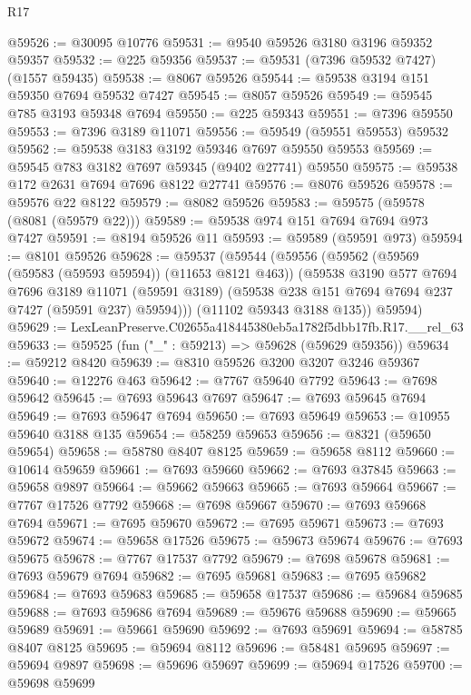 \begin{lexlean}{R17}
\begin{coremodule}
@59526 := @30095 @10776
@59531 := @9540 @59526 @3180 @3196 @59352 @59357
@59532 := @225 @59356
@59537 := @59531 (@7396 @59532 @7427) (@1557 @59435)
@59538 := @8067 @59526
@59544 := @59538 @3194 @151 @59350 @7694 @59532 @7427
@59545 := @8057 @59526
@59549 := @59545 @785 @3193 @59348 @7694
@59550 := @225 @59343
@59551 := @7396 @59550
@59553 := @7396 @3189 @11071
@59556 := @59549 (@59551 @59553) @59532
@59562 := @59538 @3183 @3192 @59346 @7697 @59550 @59553
@59569 := @59545 @783 @3182 @7697 @59345 (@9402 @27741) @59550
@59575 := @59538 @172 @2631 @7694 @7696 @8122 @27741
@59576 := @8076 @59526
@59578 := @59576 @22 @8122
@59579 := @8082 @59526
@59583 := @59575 (@59578 (@8081 (@59579 @22)))
@59589 := @59538 @974 @151 @7694 @7694 @973 @7427
@59591 := @8194 @59526 @11
@59593 := @59589 (@59591 @973)
@59594 := @8101 @59526
@59628 := @59537
    (@59544
      (@59556
        (@59562
          (@59569 (@59583 (@59593 @59594)) (@11653 @8121 @463))
          (@59538
            @3190
            @577
            @7694
            @7696
            @3189
            @11071
            (@59591 @3189)
            (@59538 @238 @151 @7694 @7694 @237 @7427 (@59591 @237) @59594)))
        (@11102 @59343 @3188 @135))
      @59594)
@59629 := LexLeanPreserve.C02655a418445380eb5a1782f5dbb17fb.R17.__rel_63
@59633 := @59525 (fun ("_" : @59213) => @59628 (@59629 @59356))
@59634 := @59212 @8420
@59639 := @8310 @59526 @3200 @3207 @3246 @59367
@59640 := @12276 @463
@59642 := @7767 @59640 @7792
@59643 := @7698 @59642
@59645 := @7693 @59643 @7697
@59647 := @7693 @59645 @7694
@59649 := @7693 @59647 @7694
@59650 := @7693 @59649
@59653 := @10955 @59640 @3188 @135
@59654 := @58259 @59653
@59656 := @8321 (@59650 @59654)
@59658 := @58780 @8407 @8125
@59659 := @59658 @8112
@59660 := @10614 @59659
@59661 := @7693 @59660
@59662 := @7693 @37845
@59663 := @59658 @9897
@59664 := @59662 @59663
@59665 := @7693 @59664
@59667 := @7767 @17526 @7792
@59668 := @7698 @59667
@59670 := @7693 @59668 @7694
@59671 := @7695 @59670
@59672 := @7695 @59671
@59673 := @7693 @59672
@59674 := @59658 @17526
@59675 := @59673 @59674
@59676 := @7693 @59675
@59678 := @7767 @17537 @7792
@59679 := @7698 @59678
@59681 := @7693 @59679 @7694
@59682 := @7695 @59681
@59683 := @7695 @59682
@59684 := @7693 @59683
@59685 := @59658 @17537
@59686 := @59684 @59685
@59688 := @7693 @59686 @7694
@59689 := @59676 @59688
@59690 := @59665 @59689
@59691 := @59661 @59690
@59692 := @7693 @59691
@59694 := @58785 @8407 @8125
@59695 := @59694 @8112
@59696 := @58481 @59695
@59697 := @59694 @9897
@59698 := @59696 @59697
@59699 := @59694 @17526
@59700 := @59698 @59699

\end{coremodule}
\end{lexlean}
